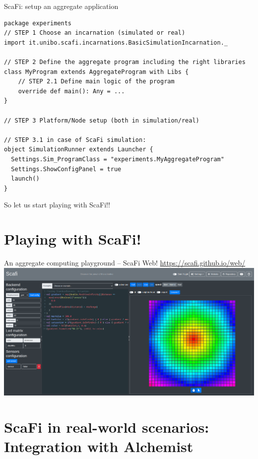 \documentclass[presentation, 9pt]{beamer}\mode<presentation>{\usetheme{AMSBolognaFC}}
\begin{document}
\begin{frame}[fragile]{ScaFi: setup an aggregate application}

\begin{verbatim}
package experiments
// STEP 1 Choose an incarnation (simulated or real)
import it.unibo.scafi.incarnations.BasicSimulationIncarnation._

// STEP 2 Define the aggregate program including the right libraries
class MyProgram extends AggregateProgram with Libs {
	// STEP 2.1 Define main logic of the program
	override def main(): Any = ...
}

// STEP 3 Platform/Node setup (both in simulation/real)

// STEP 3.1 in case of ScaFi simulation:
object SimulationRunner extends Launcher {
  Settings.Sim_ProgramClass = "experiments.MyAggregateProgram"
  Settings.ShowConfigPanel = true
  launch()
}
\end{verbatim}
\begin{center}
{\huge So let us start playing with ScaFi!! \bold{\faSmileO}}
\end{center}
\end{frame}
\section{Playing with ScaFi!}

\begin{frame}{An aggregate computing playground -- ScaFi Web!}
\centering
\url{https://scafi.github.io/web/}
\includegraphics[width=\textwidth]{img/gradient-web.png}
\end{frame}
\section{ScaFi in real-world scenarios: Integration with Alchemist}
\end{document}
